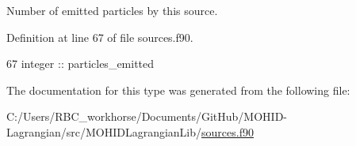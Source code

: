 Number of emitted particles by this source. 



Definition at line 67 of file sources.\+f90.


\begin{DoxyCode}
67         \textcolor{keywordtype}{integer} :: particles\_emitted
\end{DoxyCode}


The documentation for this type was generated from the following file\+:\begin{DoxyCompactItemize}
\item 
C\+:/\+Users/\+R\+B\+C\+\_\+workhorse/\+Documents/\+Git\+Hub/\+M\+O\+H\+I\+D-\/\+Lagrangian/src/\+M\+O\+H\+I\+D\+Lagrangian\+Lib/\mbox{\hyperlink{sources_8f90}{sources.\+f90}}\end{DoxyCompactItemize}
